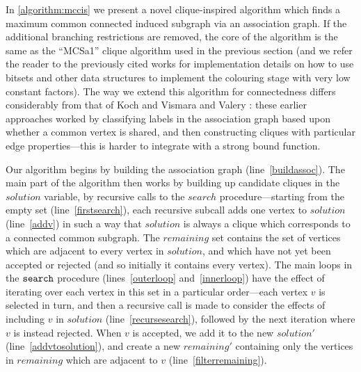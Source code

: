 \documentclass{llncs}
\newcommand{\lineref}[1]{line~\ref{#1}}
\newcommand{\twolinesref}[2]{lines~\ref{#1} and~\ref{#2}}
\begin{document}
In \cref{algorithm:mccis} we present a novel clique-inspired algorithm which finds a maximum common
connected induced subgraph via an association graph. If the additional branching
restrictions are removed, the core of the algorithm is the same as the ``MCSa1'' clique algorithm
used in the previous section (and we refer the reader to the previously cited works for
implementation details on how to use bitsets and other data structures to implement the colouring
stage with very low constant factors). The way we extend this algorithm for connectedness differs
considerably from that of Koch \cite{DBLP:journals/tcs/Koch01} and Vismara and Valery
\cite{DBLP:conf/mco/VismaraV08}: these earlier approaches worked by classifying labels in the
association graph based upon whether a common vertex is shared, and then constructing cliques with
particular edge properties---this is harder to integrate with a strong bound function.

Our algorithm begins by building the association graph (\lineref{buildassoc}). The main part of the algorithm
then works by building up candidate cliques in the $\mathit{solution}$ variable, by recursive calls
to the $\mathit{search}$ procedure---starting from the empty set (\lineref{firstsearch}), each
recursive subcall adds one vertex to $\mathit{solution}$ (\lineref{addv}) in such a way that
$\mathit{solution}$ is always a clique which corresponds to a connected common subgraph. The
$\mathit{remaining}$ set contains the set of vertices which are adjacent to every vertex in
$\mathit{solution}$, and which have not yet been accepted or rejected (and so initially it contains
every vertex). The main loops in the $\FuncSty{search}$ procedure
(\twolinesref{outerloop}{innerloop}) have the effect of iterating over each vertex in this set in a
particular order---each vertex $v$ is selected in turn, and then a recursive call is made to
consider the effects of including $v$ in $\mathit{solution}$ (\lineref{recursesearch}), followed by
the next iteration where $v$ is instead rejected. When $v$ is accepted, we add it to the new
$\mathit{solution'}$ (\lineref{addvtosolution}), and create a new $\mathit{remaining'}$ containing
only the vertices in $\mathit{remaining}$ which are adjacent to $v$ (\lineref{filterremaining}).
\end{document}

